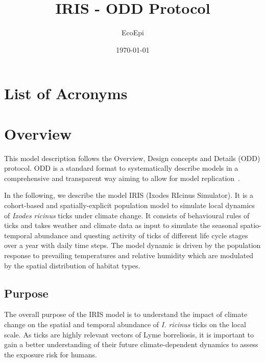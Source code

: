 \documentclass[a4paper, 11pt]{scrartcl}
\title{IRIS - ODD Protocol}
\author{EcoEpi}
\date{\today}
\begin{document}
\maketitle
\tableofcontents

\newpage
\listoffigures
\listoftables

\section*{List of Acronyms}
\begin{acronym}
\end{acronym}


\newpage
\section{Overview}
This model description follows the Overview, Design concepts and Details (ODD) protocol. ODD is a standard format to systematically describe models in a comprehensive and transparent way aiming to allow for model replication~\parencite{Grimm.2010, Grimm.2020}.

In the following, we describe the model IRIS (Ixodes RIcinus Simulator). It is a cohort-based and spatially-explicit population model to simulate local dynamics of \textit{Ixodes ricinus} ticks under climate change. It consists of behavioural rules of ticks and takes weather and climate data as input to simulate the seasonal spatio-temporal abundance and questing activity of ticks of different life cycle stages over a year with daily time steps. The model dynamic is driven by the population response to prevailing temperatures and relative humidity which are modulated by the spatial distribution of habitat types.


\subsection{Purpose}
The overall purpose of the IRIS model is to understand the impact of climate change on the spatial and temporal abundance of \textit{I. ricinus} ticks on the local scale. As ticks are highly relevant vectors of Lyme borreliosis, it is important to gain a better understanding of their future climate-dependent dynamics to assess the exposure risk for humans.
\end{document}
